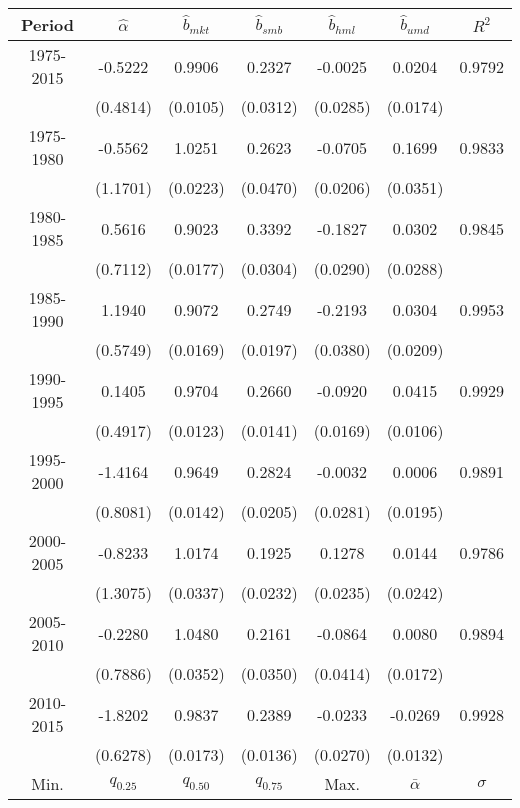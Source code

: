 	\begin{table}[p]
		\small
		\centering
		\begin{tabular}{*{7}{c}}
		\toprule
		Period & $\hat{\alpha}$ & $\hat{b}_{mkt}$ & $\hat{b}_{smb}$ & $\hat{b}_{hml}$ & $\hat{b}_{umd}$ & $R^2$ \\
		\midrule
		1975-2015 	& -0.5222 & 0.9906 & 0.2327 & -0.0025 &  0.0204 & 0.9792 \\
					&  (0.4814) & (0.0105) & (0.0312) &  (0.0285) &  (0.0174) & \\
		1975-1980 	& -0.5562 & 1.0251 & 0.2623 & -0.0705 &  0.1699 & 0.9833 \\
		        	&  (1.1701) & (0.0223) & (0.0470) &  (0.0206) &  (0.0351) & \\
		1980-1985 	&  0.5616 & 0.9023 & 0.3392 & -0.1827 &  0.0302 & 0.9845 \\
		        	&  (0.7112) & (0.0177) & (0.0304) &  (0.0290) &  (0.0288) & \\
		1985-1990 	&  1.1940 & 0.9072 & 0.2749 & -0.2193 &  0.0304 & 0.9953 \\
		        	&  (0.5749) & (0.0169) & (0.0197) &  (0.0380) &  (0.0209) & \\
		1990-1995 	&  0.1405 & 0.9704 & 0.2660 & -0.0920 &  0.0415 & 0.9929 \\
		        	&  (0.4917) & (0.0123) & (0.0141) &  (0.0169) &  (0.0106) & \\
		1995-2000 	& -1.4164 & 0.9649 & 0.2824 & -0.0032 &  0.0006 & 0.9891 \\
		        	&  (0.8081) & (0.0142) & (0.0205) &  (0.0281) &  (0.0195) & \\
		2000-2005 	& -0.8233 & 1.0174 & 0.1925 &  0.1278 &  0.0144 & 0.9786 \\
		        	&  (1.3075) & (0.0337) & (0.0232) &  (0.0235) &  (0.0242) & \\
		2005-2010 	& -0.2280 & 1.0480 & 0.2161 & -0.0864 &  0.0080 & 0.9894 \\
		        	&  (0.7886) & (0.0352) & (0.0350) &  (0.0414) &  (0.0172) & \\
		2010-2015 	& -1.8202 & 0.9837 & 0.2389 & -0.0233 & -0.0269 & 0.9928 \\
		        	&  (0.6278) & (0.0173) & (0.0136) &  (0.0270) &  (0.0132) & \\
		\midrule
		Min. & $q_{0.25}$ & $q_{0.50}$ & $q_{0.75}$ & Max. & $\bar{\alpha}$ & $\sigma$ \\

\end{tabular}
\end{table}
